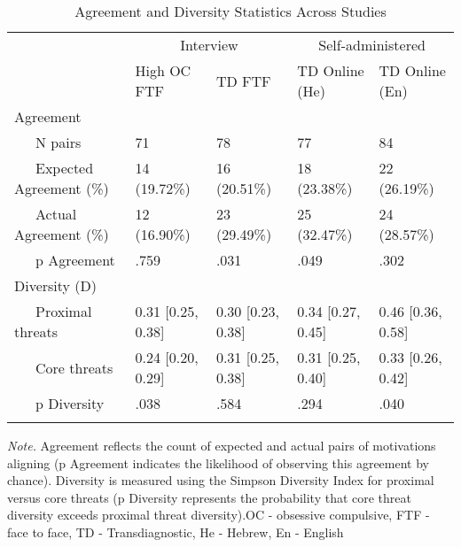 \documentclass[
  man,floatsintext]{apa7}
\begin{document}
\begin{table}[tbp]

\begin{center}
\begin{threeparttable}

\caption{\label{tab:agreement}Agreement and Diversity Statistics Across Studies}

\begin{tabular}{lllll}
\toprule
 & \multicolumn{2}{c}{Interview} & \multicolumn{2}{c}{Self-administered} \\
\cmidrule(r){2-3} \cmidrule(r){4-5}
 & High OC FTF & TD FTF & TD Online (He) & TD Online (En)\\
\midrule
Agreement &  &  &  & \\
\ \ \ N pairs & 71 & 78 & 77 & 84\\
\ \ \ Expected Agreement (\%) & 14 (19.72\%) & 16 (20.51\%) & 18 (23.38\%) & 22 (26.19\%)\\
\ \ \ Actual Agreement (\%) & 12 (16.90\%) & 23 (29.49\%) & 25 (32.47\%) & 24 (28.57\%)\\
\ \ \ p Agreement & .759 & .031 & .049 & .302\\
Diversity (D) &  &  &  & \\
\ \ \ Proximal threats & 0.31 [0.25, 0.38] & 0.30 [0.23, 0.38] & 0.34 [0.27, 0.45] & 0.46 [0.36, 0.58]\\
\ \ \ Core threats & 0.24 [0.20, 0.29] & 0.31 [0.25, 0.38] & 0.31 [0.25, 0.40] & 0.33 [0.26, 0.42]\\
\ \ \ p Diversity & .038 & .584 & .294 & .040\\
\bottomrule
\addlinespace
\end{tabular}

\begin{tablenotes}[para]
\normalsize{\textit{Note.} Agreement reflects the count of expected and actual pairs of motivations aligning (p Agreement indicates the likelihood of observing this agreement by chance). Diversity is measured using the Simpson Diversity Index for proximal versus core threats (p Diversity represents the probability that core threat diversity exceeds proximal threat diversity).OC - obsessive compulsive, FTF - face to face, TD - Transdiagnostic, He - Hebrew, En - English}
\end{tablenotes}

\end{threeparttable}
\end{center}

\end{table}
\end{document}
